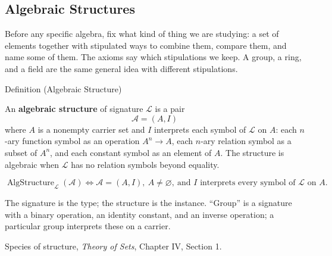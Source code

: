 
\subsection{Algebraic Structures}
\label{sec:algebraic-structures}

\begin{remark*}
Before any specific algebra, fix what kind of thing we are studying: a set
of elements together with stipulated ways to combine them, compare them, and
name some of them. The axioms say which stipulations we keep. A group, a
ring, and a field are the same general idea with different stipulations.
\end{remark*}

\begin{definitionbox}{Definition (Algebraic Structure)}
\begin{definition}
\label{def:algebraic-structure}
An \textbf{algebraic structure} of signature $\mathcal L$ is a pair
\[
  \mathcal A=(A,I)
\]
where $A$ is a nonempty carrier set and $I$ interprets each symbol of
$\mathcal L$ on $A$: each $n$-ary function symbol as an operation
$A^n\to A$, each $n$-ary relation symbol as a subset of $A^n$, and each
constant symbol as an element of $A$. The structure is algebraic when
$\mathcal L$ has no relation symbols beyond equality.
\end{definition}
\end{definitionbox}

\begin{remark*}
\[
\operatorname{AlgStructure}_{\mathcal L}(\mathcal A)
\Longleftrightarrow
\mathcal A=(A,I),\ A\neq\varnothing,\ \text{and } I
\text{ interprets every symbol of }\mathcal L\text{ on }A.
\]
\end{remark*}

\begin{remark*}[Interpretation]
The signature is the type; the structure is the instance. ``Group'' is a
signature with a binary operation, an identity constant, and an inverse
operation; a particular group interprets these on a carrier.
\end{remark*}

\begin{remark*}
Species of structure, \textit{Theory of Sets}, Chapter IV, Section 1.
\end{remark*}

